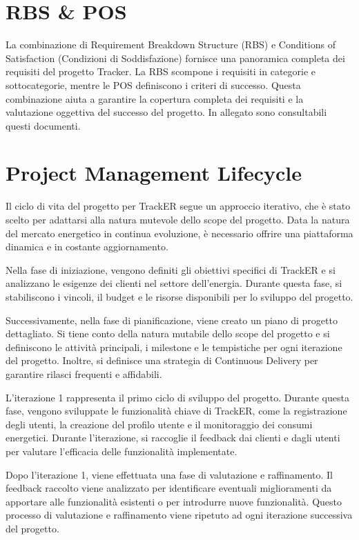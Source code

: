 \documentclass[oneside]{book}
\begin{document}
\section{RBS \& POS}

La combinazione di Requirement Breakdown Structure (RBS) e Conditions of Satisfaction (Condizioni di Soddisfazione) fornisce una panoramica completa dei requisiti del progetto Tracker. La RBS scompone i requisiti in categorie e sottocategorie, mentre le POS definiscono i criteri di successo. Questa combinazione aiuta a garantire la copertura completa dei requisiti e la valutazione oggettiva del successo del progetto.
In allegato sono consultabili questi documenti.

\section{Project Management Lifecycle}
Il ciclo di vita del progetto per TrackER segue un approccio iterativo, che è stato scelto per adattarsi alla natura mutevole dello scope del progetto. Data la natura del mercato energetico in continua evoluzione, è necessario offrire una piattaforma dinamica e in costante aggiornamento.

Nella fase di iniziazione, vengono definiti gli obiettivi specifici di TrackER e si analizzano le esigenze dei clienti nel settore dell'energia. Durante questa fase, si stabiliscono i vincoli, il budget e le risorse disponibili per lo sviluppo del progetto.

Successivamente, nella fase di pianificazione, viene creato un piano di progetto dettagliato. Si tiene conto della natura mutabile dello scope del progetto e si definiscono le attività principali, i milestone e le tempistiche per ogni iterazione del progetto. Inoltre, si definisce una strategia di Continuous Delivery per garantire rilasci frequenti e affidabili.

L'iterazione 1 rappresenta il primo ciclo di sviluppo del progetto. Durante questa fase, vengono sviluppate le funzionalità chiave di TrackER, come la registrazione degli utenti, la creazione del profilo utente e il monitoraggio dei consumi energetici. Durante l'iterazione, si raccoglie il feedback dai clienti e dagli utenti per valutare l'efficacia delle funzionalità implementate.

Dopo l'iterazione 1, viene effettuata una fase di valutazione e raffinamento. Il feedback raccolto viene analizzato per identificare eventuali miglioramenti da apportare alle funzionalità esistenti o per introdurre nuove funzionalità. Questo processo di valutazione e raffinamento viene ripetuto ad ogni iterazione successiva del progetto.
\end{document}
